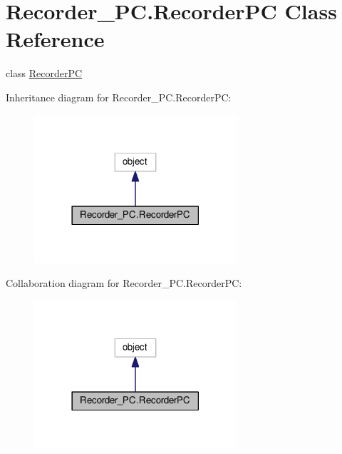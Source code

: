 \hypertarget{classRecorder__PC_1_1RecorderPC}{}\section{Recorder\+\_\+\+P\+C.\+Recorder\+PC Class Reference}
\label{classRecorder__PC_1_1RecorderPC}


class \hyperlink{classRecorder__PC_1_1RecorderPC}{Recorder\+PC}  




Inheritance diagram for Recorder\+\_\+\+P\+C.\+Recorder\+PC\+:
\nopagebreak
\begin{figure}[H]
\begin{center}
\leavevmode
\includegraphics[width=213pt]{classRecorder__PC_1_1RecorderPC__inherit__graph}
\end{center}
\end{figure}


Collaboration diagram for Recorder\+\_\+\+P\+C.\+Recorder\+PC\+:
\nopagebreak
\begin{figure}[H]
\begin{center}
\leavevmode
\includegraphics[width=213pt]{classRecorder__PC_1_1RecorderPC__coll__graph}
\end{center}
\end{figure}
